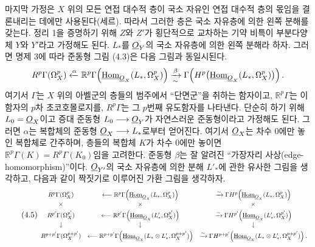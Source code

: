마지막 가정은 $X$ 위의 모든 연접 대수적 층이 국소 자유인 연접 대수적
층의 몫임을 결론내리는 데에만 사용된다(세르). 따라서 그러한 층은
국소 자유층에 의한 왼쪽 분해를 갖는다. 정리 1을 증명하기 위해
$Z$와 $Z'$가 횡단적으로 교차하는 기약 비특이 부분다양체 $Y$와 $Y'$라고
가정해도 된다. $L_{*}$를 $\underline{O}_Y$의 국소 자유층에 의한 왼쪽
분해라 하자. 그러면 명제 3에 따라 준동형 그림 (4.3)은 다음 그림과
동일시된다.
\[
R^{p}\Gamma(\Omega_X^{p})
\xleftarrow{\alpha}
\mathbb R^{p}\Gamma\!\left(\underline{\operatorname{Hom}}_{\underline{O}_X}(L_{*},\Omega_X^{p})\right)
\xrightarrow[\sim]{\beta}
\Gamma\!\left(H^{p}\bigl(\underline{\operatorname{Hom}}_{\underline{O}_X}(L_{*},\Omega_X^{p})\bigr)\right).
\]
여기서 $\Gamma$는 $X$ 위의 아벨군의 층들의 범주에서 ``단면군''을 취하는
함자이고, $\mathbb R^{p}\Gamma$는 이 함자의 $p$차 초코호몰로지를,
$R^{p}\Gamma$는 그 $p$번째 유도함자를 나타낸다. 단순히 하기 위해
$L_0=\underline{O}_X$이고 증대 준동형 $L_0\longrightarrow\underline{O}_Y$가 자연스러운
준동형이라고 가정해도 된다. 그러면 $\alpha$는 복합체의 준동형
$\underline{O}_X\longrightarrow L_{*}$로부터 얻어진다. 여기서 $\underline{O}_X$는 차수
$0$에만 놓인 복합체로 간주하며, 층들의 복합체 $K$가 차수 $0$에만
놓이면 $\mathbb R^{p}\Gamma(K)=R^{p}\Gamma(K_0)$임을 고려한다. 준동형
$\beta$는 잘 알려진 ``가장자리 사상(edge-homomorphism)''이다.
$\underline{O}_{Y'}$의 국소 자유층에 의한 분해 $L'_{*}$에 관한 유사한 그림을 생각하고,
다음과 같이 짝짓기로 이루어진 가환 그림을 생각하자.
\begin{equation}\tag{4.5}
\resizebox{\textwidth}{!}{$
\begin{array}{ccc}
R^{p}\Gamma(\Omega_X^{p})
&\longleftarrow
\mathbb R^{p}\Gamma\!\left(\Homsh_{\Osh_X}(L_{*},\Omega_X^{p})\right)
&\xrightarrow{\sim}
\Gamma H^{p}\!\left(\Homsh_{\Osh_X}(L_{*},\Omega_X^{p})\right)
\\[3pt]
\times&\times&\times\\[3pt]
R^{p'}\Gamma(\Omega_X^{p'})
&\longleftarrow
\mathbb R^{p'}\Gamma\!\left(\Homsh_{\Osh_X}(L'_{*},\Omega_X^{p'})\right)
&\xrightarrow{\sim}
\Gamma H^{p'}\!\left(\Homsh_{\Osh_X}(L'_{*},\Omega_X^{p'})\right)
\\[3pt]
\downarrow&\downarrow&\downarrow\\[3pt]
R^{p+p'}\Gamma(\Omega_X^{p+p'})
&\longleftarrow
\mathbb R^{p+p'}\Gamma\!\left(
\Homsh_{\Osh_X}(L_{*}\otimes L'_{*},\Omega_X^{p+p'})\right)
&\xrightarrow{\sim}
\Gamma H^{p+p'}\!\left(
\Homsh_{\Osh_X}(L_{*}\otimes L'_{*},\Omega_X^{p+p'})\right).
\end{array}
$}
\end{equation}

